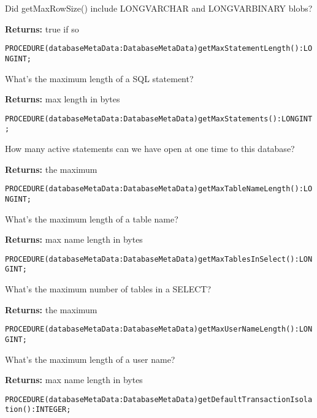 Did getMaxRowSize() include LONGVARCHAR and LONGVARBINARY blobs? 


{\bf Returns: } 
true if so 




\verb'PROCEDURE(databaseMetaData:DatabaseMetaData)getMaxStatementLength():LONGINT;'






What's the maximum length of a SQL statement? 


{\bf Returns: } 
max length in bytes 




\verb'PROCEDURE(databaseMetaData:DatabaseMetaData)getMaxStatements():LONGINT;'






How many active statements can we have open at one time to this database? 


{\bf Returns: } 
the maximum 




\verb'PROCEDURE(databaseMetaData:DatabaseMetaData)getMaxTableNameLength():LONGINT;'






What's the maximum length of a table name? 


{\bf Returns: } 
max name length in bytes 




\verb'PROCEDURE(databaseMetaData:DatabaseMetaData)getMaxTablesInSelect():LONGINT;'






What's the maximum number of tables in a SELECT? 


{\bf Returns: } 
the maximum 




\verb'PROCEDURE(databaseMetaData:DatabaseMetaData)getMaxUserNameLength():LONGINT;'






What's the maximum length of a user name? 


{\bf Returns: } 
max name length in bytes 




\verb'PROCEDURE(databaseMetaData:DatabaseMetaData)getDefaultTransactionIsolation():INTEGER;'






